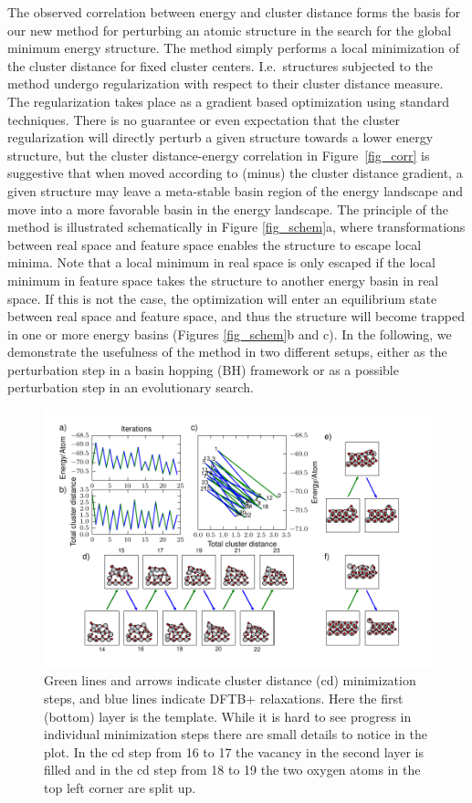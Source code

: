 \documentclass[aip,amsmath,amssymb,reprint]{revtex4-1}
\begin{document}
The observed correlation between energy and cluster distance forms the
basis for our new method for perturbing an atomic structure in the
search for the global minimum energy structure. The method simply
performs a local minimization of the cluster distance for fixed
cluster centers. I.e.\ structures subjected to the method undergo
regularization with respect to their cluster distance measure. The
regularization takes place as a gradient based optimization using
standard techniques. There is no guarantee or even expectation that the
cluster regularization will directly perturb a given structure towards
a lower energy structure, but the cluster distance-energy correlation
in Figure\ \ref{fig_corr} is suggestive that when moved according to (minus) the cluster distance gradient, a given structure may leave a meta-stable basin
region of the energy landscape and move into a more favorable
basin in the energy landscape. The principle of the method is illustrated
schematically in Figure \ref{fig_schem}a, where transformations between real space and feature space enables the structure to escape local minima. Note that a local minimum in real space is only escaped if the local minimum in feature space takes the structure to another energy basin in real space. If this is not the case, the optimization will enter an equilibrium state between real space and feature space, and thus the structure will become trapped in one or more energy basins (Figures \ref{fig_schem}b and c). In the following, we demonstrate the usefulness of
the method in two different setups,
either as the perturbation step in a basin hopping (BH) framework or as a
possible perturbation step in an evolutionary search.

\begin{figure}[tb]
    \centering
    \includegraphics[width=2.0\columnwidth]{fig6-minimize.pdf}
    \caption{Green lines and arrows indicate cluster distance (cd) minimization steps, and blue lines indicate DFTB+ relaxations. Here the first (bottom) layer is the template. While it is hard to see progress in individual minimization steps there are small details to notice in the plot. In the cd step from 16 to 17 the vacancy in the second layer is filled and in the cd step from 18 to 19 the two oxygen atoms in the top left corner are split up.}
    \label{fig_min}
\end{figure}
\end{document}
